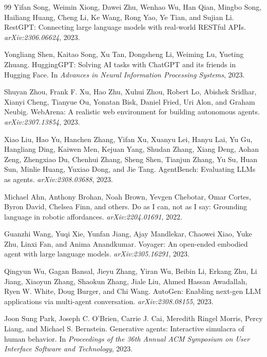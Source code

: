 \documentclass[10pt,twocolumn]{article}
\begin{document}
\begin{thebibliography}{99}
Yifan Song, Weimin Xiong, Dawei Zhu, Wenhao Wu, Han Qian, Mingbo Song, Hailiang Huang, Cheng Li, Ke Wang, Rong Yao, Ye Tian, and Sujian Li.
\newblock RestGPT: Connecting large language models with real-world RESTful APIs.
\newblock \emph{arXiv:2306.06624}, 2023.

Yongliang Shen, Kaitao Song, Xu Tan, Dongsheng Li, Weiming Lu, Yueting Zhuang.
\newblock HuggingGPT: Solving AI tasks with ChatGPT and its friends in Hugging Face.
\newblock In \emph{Advances in Neural Information Processing Systems}, 2023.

Shuyan Zhou, Frank F. Xu, Hao Zhu, Xuhui Zhou, Robert Lo, Abishek Sridhar, Xianyi Cheng, Tianyue Ou, Yonatan Bisk, Daniel Fried, Uri Alon, and Graham Neubig.
\newblock WebArena: A realistic web environment for building autonomous agents.
\newblock \emph{arXiv:2307.13854}, 2023.

Xiao Liu, Hao Yu, Hanchen Zhang, Yifan Xu, Xuanyu Lei, Hanyu Lai, Yu Gu, Hangliang Ding, Kaiwen Men, Kejuan Yang, Shudan Zhang, Xiang Deng, Aohan Zeng, Zhengxiao Du, Chenhui Zhang, Sheng Shen, Tianjun Zhang, Yu Su, Huan Sun, Minlie Huang, Yuxiao Dong, and Jie Tang.
\newblock AgentBench: Evaluating LLMs as agents.
\newblock \emph{arXiv:2308.03688}, 2023.

Michael Ahn, Anthony Brohan, Noah Brown, Yevgen Chebotar, Omar Cortes, Byron David, Chelsea Finn, and others.
\newblock Do as I can, not as I say: Grounding language in robotic affordances.
\newblock \emph{arXiv:2204.01691}, 2022.

Guanzhi Wang, Yuqi Xie, Yunfan Jiang, Ajay Mandlekar, Chaowei Xiao, Yuke Zhu, Linxi Fan, and Anima Anandkumar.
\newblock Voyager: An open-ended embodied agent with large language models.
\newblock \emph{arXiv:2305.16291}, 2023.

Qingyun Wu, Gagan Bansal, Jieyu Zhang, Yiran Wu, Beibin Li, Erkang Zhu, Li Jiang, Xiaoyun Zhang, Shaokun Zhang, Jiale Liu, Ahmed Hassan Awadallah, Ryen W. White, Doug Burger, and Chi Wang.
\newblock AutoGen: Enabling next-gen LLM applications via multi-agent conversation.
\newblock \emph{arXiv:2308.08155}, 2023.

Joon Sung Park, Joseph C. O'Brien, Carrie J. Cai, Meredith Ringel Morris, Percy Liang, and Michael S. Bernstein.
\newblock Generative agents: Interactive simulacra of human behavior.
\newblock In \emph{Proceedings of the 36th Annual ACM Symposium on User Interface Software and Technology}, 2023.


\end{thebibliography}
\end{document}
